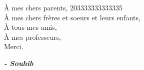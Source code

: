 
\begin{fquote}
\begin{center}
\large{

\uppercase{à} mes chers parents, 203333333333335 \\[12pt]
\uppercase{à} mes chers frères et soeurs et leurs enfants,\\[12pt]
\uppercase{à} tous mes amis,\\[12pt]
\uppercase{à} mes professeurs,\\[12pt]
Merci.
}
\end{center}
\bigskip
\medskip
\end{fquote}

\begin{adjustwidth}{2cm}{1cm}
\hspace*{\fill} \textbf{\textit{\large{- Souhib}}}
\end{adjustwidth}

\clearpage
